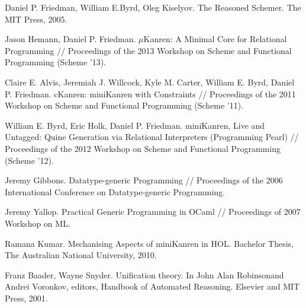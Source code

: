 \documentclass{llncs}
\begin{document}
\begin{thebibliography}{99}
Daniel P. Friedman, William E.Byrd, Oleg Kiselyov. The Reasoned Schemer. The MIT
Press, 2005.

Jason Hemann, Daniel P. Friedman. $\mu$Kanren: A Minimal Core for Relational Programming //
Proceedings of the 2013 Workshop on Scheme and Functional Programming (Scheme '13).

Claire E. Alvis, Jeremiah J. Willcock, Kyle M. Carter, William E. Byrd, Daniel P. Friedman.
cKanren: miniKanren with Constraints //
Proceedings of the 2011 Workshop on Scheme and Functional Programming (Scheme '11).

William E. Byrd, Eric Holk, Daniel P. Friedman.
miniKanren, Live and Untagged: Quine Generation via Relational Interpreters (Programming Pearl) //
Proceedings of the 2012 Workshop on Scheme and Functional Programming (Scheme '12).




Jeremy Gibbons. Datatype-generic Programming //
Proceedings of the 2006 International Conference on Datatype-generic Programming.

Jeremy Yallop.
Practical Generic Programming in OCaml // Proceedings of 2007 Workshop on ML.



Ramana Kumar. Mechanising Aspects of miniKanren in HOL. Bachelor Thesis, The Australian National University, 2010.

Franz Baader, Wayne Snyder. Uniﬁcation theory. In John Alan Robinsonand Andrei Voronkov, editors,
Handbook of Automated Reasoning. Elsevier and MIT Press, 2001.


\end{thebibliography}
\end{document}
